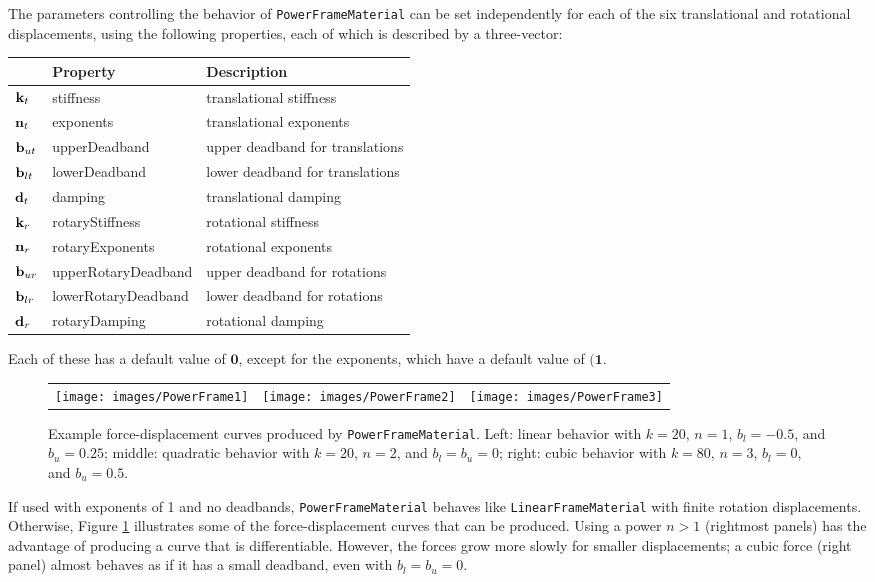 The parameters controlling the behavior of {\tt PowerFrameMaterial} can be set
independently for each of the six translational and rotational displacements,
using the following properties, each of which is described by a three-vector:
%
\begin{center}
\begin{tabular}{|l|l|l|} \hline
 & Property & Description \\
\hline
${\bf k}_t$ & {\sf stiffness} & translational stiffness \\
${\bf n}_t$ & {\sf exponents} & translational exponents \\
${\bf b}_{ut}$ & {\sf upperDeadband} & upper deadband for translations \\
${\bf b}_{lt}$ & {\sf lowerDeadband} & lower deadband for translations \\
${\bf d}_t$ & {\sf damping} & translational damping \\
${\bf k}_r$ & {\sf rotaryStiffness} & rotational stiffness \\
${\bf n}_r$ & {\sf rotaryExponents} & rotational exponents \\
${\bf b}_{ur}$ & {\sf upperRotaryDeadband} & upper deadband for rotations \\
${\bf b}_{lr}$ & {\sf lowerRotaryDeadband} & lower deadband for rotations \\
${\bf d}_r$ & {\sf rotaryDamping} & rotational damping \\
\hline
\end{tabular}
\end{center}
Each of these has a default value of $\mathbf{0}$, except for the exponents,
which have a default value of $(\mathbf{1}$.

\begin{figure}[ht]
\begin{center}
\begin{tabular}{ccc}
   \texttt{[image: images/PowerFrame1]}&
   \texttt{[image: images/PowerFrame2]}&
   \texttt{[image: images/PowerFrame3]}
\end{tabular}
\end{center}
\caption{Example force-displacement curves produced by {\tt PowerFrameMaterial}.
Left: linear behavior with $k=20$, $n=1$, $b_l=-0.5$, and $b_u=0.25$;
middle: quadratic behavior with $k=20$, $n=2$, and $b_l= b_u=0$;
right: cubic behavior with $k=80$, $n=3$, $b_l=0$, and $b_u=0.5$.}
\label{PowerFrameMaterial:fig}
\end{figure}

If used with exponents of 1 and no deadbands, {\tt PowerFrameMaterial} behaves
like {\tt LinearFrameMaterial} with finite rotation displacements.  Otherwise,
Figure \ref{PowerFrameMaterial:fig} illustrates some of the force-displacement
curves that can be produced. Using a power $n > 1$ (rightmost panels) has the
advantage of producing a curve that is differentiable.  However, the forces
grow more slowly for smaller displacements; a cubic force (right panel) almost
behaves as if it has a small deadband, even with $b_l = b_u = 0$.

